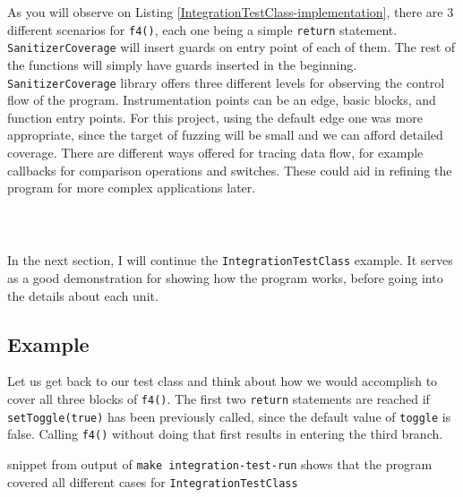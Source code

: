 \documentclass{elteikthesis}[2018/06/06]
\newcommand*{\code}{\lstinline[keywordstyle=\color{violet}, basicstyle=\color{violet}]}
\begin{document}
As you will observe on Listing \ref{IntegrationTestClass-implementation}, there are 3 different scenarios for \code{f4()}, each one being a simple \code{return} statement. \code{SanitizerCoverage} will insert guards on entry point of each of them. The rest of the functions will simply have guards inserted in the beginning. \\

\code{SanitizerCoverage} library offers three different levels for observing the control flow of the program. Instrumentation points can be an edge, basic blocks, and function entry points. For this project, using the default edge one was more appropriate, since the target of fuzzing will be small and we can afford detailed coverage. There are different ways offered for tracing data flow, for example callbacks for comparison operations and switches. These could aid in refining the program for more complex applications later. \\

\begin{listing}
\caption{\label{IntegrationTestClass-implementation}Implementation of \code{IntegrationTestClass::f2()} provided in \code{test/integrationTestClass.cc}, with inserted guards highlighted \uline{(TODO)}}
\inputminted[firstline=12,lastline=21]{c++}{test/integrationTestClass.cc} \\
\end{listing}

In the next section, I will continue the \code{IntegrationTestClass} example. It serves as a good demonstration for showing how the program works, before going into the details about each unit. \\
\subsection{Example}
\label{sec-3-1-2}
Let us get back to our test class and think about how we would accomplish to cover all three blocks of \code{f4()}. The first two \code{return} statements are reached if \code{setToggle(true)} has been previously called, since the default value of \code{toggle} is false. Calling \code{f4()} without doing that first results in entering the third branch. \\

\begin{listing}
\caption{\label{integration-test-output}snippet from output of \code{make integration-test-run} shows that the program covered all different cases for \code{IntegrationTestClass}}
\inputminted[lastline=17,fontsize=\small,breaklines]{text}{integration-test-results.txt} \\
\end{listing}
\end{document}
